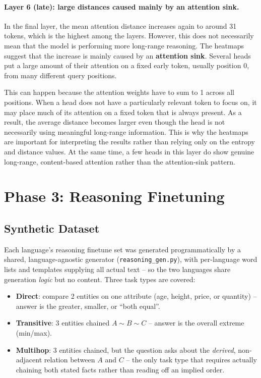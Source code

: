 \documentclass[10pt,a4paper]{article}
\begin{document}
\paragraph{Layer 6 (late): large distances caused mainly by an attention
sink.}
In the final layer, the mean attention distance increases again to around
31 tokens, which is the highest among the layers. However, this does not
necessarily mean that the model is performing more long-range reasoning.
The heatmaps suggest that the increase is mainly caused by an
\textbf{attention sink}. Several heads put a large amount of their
attention on a fixed early token, usually position 0, from many different
query positions.

This can happen because the attention weights have to sum to 1 across
all positions. When a head does not have a particularly relevant token
to focus on, it may place much of its attention on a fixed token that is
always present. As a result, the average distance becomes larger even
though the head is not necessarily using meaningful long-range
information. This is why the heatmaps are important for interpreting
the results rather than relying only on the entropy and distance values.
At the same time, a few heads in this layer do show genuine
long-range, content-based attention rather than the attention-sink
pattern.



\section{Phase 3: Reasoning Finetuning}

\subsection{Synthetic Dataset}
Each language's reasoning finetune set was generated programmatically by a
shared, language-agnostic generator (\texttt{reasoning\_gen.py}), with
per-language word lists and templates supplying all actual text -- so the
two languages share generation \emph{logic} but no content. Three task
types are covered:
\begin{itemize}
\item \textbf{Direct}: compare 2 entities on one attribute (age, height,
price, or quantity) -- answer is the greater, smaller, or ``both equal''.
\item \textbf{Transitive}: 3 entities chained $A\sim B\sim C$ -- answer is
the overall extreme (min/max).
\item \textbf{Multihop}: 3 entities chained, but the question asks about
the \emph{derived}, non-adjacent relation between $A$ and $C$ -- the only
task type that requires actually chaining both stated facts rather than
reading off an implied order.
\end{itemize}
\end{document}
